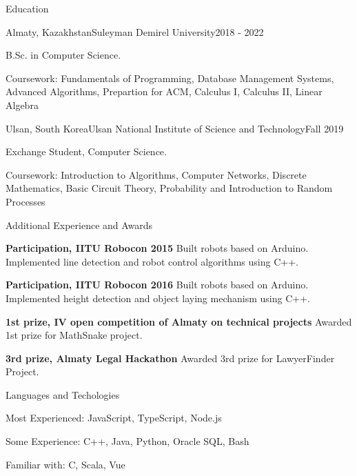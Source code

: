 \documentclass[]{mcdowellcv}
\let\tempone\itemize
\let\temptwo\enditemize
\renewenvironment{itemize}{\tempone\addtolength{\itemsep}{0.25\baselineskip}}{\temptwo}
\begin{document}
	\begin{cvsection}{Education}
		\begin{cvsubsection}{Almaty, Kazakhstan}{Suleyman Demirel University}{2018 - 2022}
			\begin{itemize}
				\item B.Sc. in Computer Science.
        \item Coursework: Fundamentals of Programming, Database Management Systems, Advanced Algorithms, Prepartion for ACM, Calculus I, Calculus II, Linear Algebra
			\end{itemize}
		\end{cvsubsection}

    \begin{cvsubsection}{Ulsan, South Korea}{Ulsan National Institute of Science and Technology}{Fall 2019}
			\begin{itemize}
				\item Exchange Student, Computer Science.
				\item Coursework: Introduction to Algorithms, Computer Networks, Discrete Mathematics, Basic Circuit Theory, Probability and Introduction to Random Processes
			\end{itemize}
		\end{cvsubsection}
	\end{cvsection}

  \begin{cvsection}{Additional Experience and Awards}
		\begin{cvsubsection}{}{}{}	
			\begin{itemize}
				\item \textbf{Participation, IITU Robocon 2015} Built robots based on Arduino. Implemented line detection and robot control algorithms using C++.
				\item \textbf{Participation, IITU Robocon 2016} Built robots based on Arduino. Implemented height detection and object laying mechanism using C++.
				\item \textbf{1st prize, IV open competition of Almaty on technical projects} Awarded 1st prize for MathSnake project.
				\item \textbf{3rd prize, Almaty Legal Hackathon} Awarded 3rd prize for LawyerFinder Project.
			\end{itemize}
		\end{cvsubsection}
	\end{cvsection}
	
	\begin{cvsection}{Languages and Techologies}
		\begin{cvsubsection}{}{}{}	
			\begin{itemize}
        \item Most Experienced: JavaScript, TypeScript, Node.js
        \item Some Experience: C++, Java, Python, Oracle SQL, Bash
        \item Familiar with: C, Scala, Vue
			\end{itemize}
		\end{cvsubsection}
	\end{cvsection}
\end{document}
